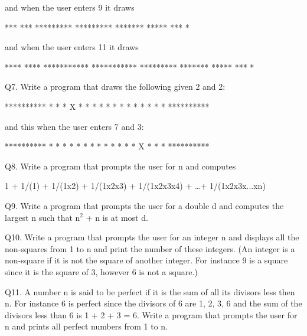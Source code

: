 and when the user enters 9 it draws
\begin{console}
 *** ***
*********
*********
 *******
  *****
   ***
    *
\end{console}
and when the user enters 11 it draws
\begin{console}
 **** ****
***********
***********
 *********
  *******
   *****
    ***
     *
\end{console}
Q7. Write a program that draws the following given 2 and 2:
\begin{console}
**********
*        *
* X      *
*        *
*        *
*        *
*        *
*        *
*        *
**********
\end{console}
and this when the user enters 7 and 3:
\begin{console}
**********
*        *
*        *
*        *
*        *
*        *
*        *
*  X     *
*        *
**********
\end{console}
Q8. Write a program that prompts the user for n and computes

\begin{center}
1 + 1/(1) + 1/(1x2) + 1/(1x2x3) + 1/(1x2x3x4) + \ldots + 1/(1x2x3x...xn)
\end{center}

Q9. Write a program that prompts the user for a double d and computes
the largest n such that n$^{2}$ + n is at most d.

Q10. Write a program that prompts the user for an integer n and displays
all the non-squares from 1 to n and print the number of these integers.
(An integer is a non-square if it is not the square of another integer.
For instance 9 is a square since it is the square of 3, however 6 is not
a square.)

Q11. A number n is said to be perfect if it is the sum of all its
divisors less then n. For instance 6 is perfect since the divisors of 6
are 1, 2, 3, 6 and the sum of the divisors less than 6 is 1 + 2 + 3 = 6.
Write a program that prompts the user for n and prints all perfect
numbers from 1 to n.
